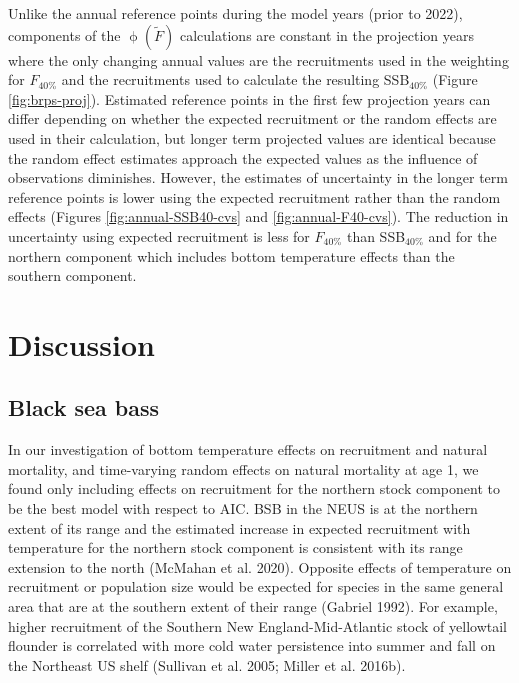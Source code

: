\documentclass[
]{article}
\begin{document}
Unlike the annual reference points during the model years (prior to 2022), components of the \(\upphi(\widetilde{F})\) calculations are constant in the projection years where the only changing annual values are the recruitments used in the weighting for \(F_{40\%}\) and the recruitments used to calculate the resulting SSB\(_{40\%}\) (Figure \ref{fig:brps-proj}). Estimated reference points in the first few projection years can differ depending on whether the expected recruitment or the random effects are used in their calculation, but longer term projected values are identical because the random effect estimates approach the expected values as the influence of observations diminishes. However, the estimates of uncertainty in the longer term reference points is lower using the expected recruitment rather than the random effects (Figures \ref{fig:annual-SSB40-cvs} and \ref{fig:annual-F40-cvs}). The reduction in uncertainty using expected recruitment is less for \(F_{40\%}\) than SSB\(_{40\%}\) and for the northern component which includes bottom temperature effects than the southern component.

\hypertarget{discussion}{%
\section*{Discussion}\label{discussion}}

\hypertarget{black-sea-bass}{%
\subsection*{Black sea bass}\label{black-sea-bass}}

In our investigation of bottom temperature effects on recruitment and natural mortality, and time-varying random effects on natural mortality at age 1, we found only including effects on recruitment for the northern stock component to be the best model with respect to AIC. BSB in the NEUS is at the northern extent of its range and the estimated increase in expected recruitment with temperature for the northern stock component is consistent with its range extension to the north (McMahan et al. 2020). Opposite effects of temperature on recruitment or population size would be expected for species in the same general area that are at the southern extent of their range (Gabriel 1992). For example, higher recruitment of the Southern New England-Mid-Atlantic stock of yellowtail flounder is correlated with more cold water persistence into summer and fall on the Northeast US shelf (Sullivan et al. 2005; Miller et al. 2016b).
\end{document}
